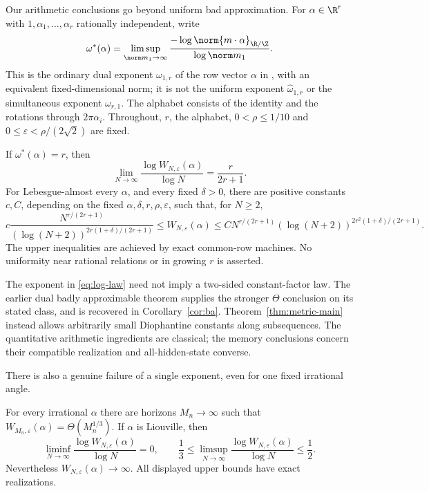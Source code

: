 Our arithmetic conclusions go beyond uniform bad approximation. For $\alpha\in\R^r$ with $1,\alpha_1,\ldots,\alpha_r$ rationally independent, write
\begin{equation}\label{eq:type-intro}
 \omega^*(\alpha)=\limsup_{\norm m_1\to\infty}
       \frac{-\log\norm{m\cdot\alpha}_{\R/\Z}}{\log\norm m_1}.
\end{equation}
This is the ordinary dual exponent $\omega_{1,r}$ of the row vector $\alpha$ in \cite[Definition 1]{BL06}, with an equivalent fixed-dimensional norm; it is not the uniform exponent $\widehat\omega_{1,r}$ or the simultaneous exponent $\omega_{r,1}$. The alphabet consists of the identity and the rotations through $2\pi\alpha_i$. Throughout, $r$, the alphabet, $0<\rho\le1/10$ and
$0\le\varepsilon<\rho/(2\sqrt2)$ are fixed.

\begin{theorem}\label{thm:metric-main}
If $\omega^*(\alpha)=r$, then
\begin{equation}\label{eq:log-law}
 \lim_{N\to\infty}\frac{\log W_{N,\varepsilon}(\alpha)}{\log N}
                         =\frac{r}{2r+1}.
\end{equation}
For Lebesgue-almost every $\alpha$, and every fixed $\delta>0$, there are positive constants $c,C$, depending on the fixed $\alpha,\delta,r,\rho,\varepsilon$, such that, for $N\ge2$,
\begin{equation}\label{eq:ae-log-bounds}
 c\frac{N^{r/(2r+1)}}{(\log(N+2))^{2r(1+\delta)/(2r+1)}}
 \le W_{N,\varepsilon}(\alpha)
 \le C N^{r/(2r+1)}(\log(N+2))^{2r^2(1+\delta)/(2r+1)}.
\end{equation}
The upper inequalities are achieved by exact common-row machines. No uniformity near rational relations or in growing $r$ is asserted.
\end{theorem}

The exponent in \eqref{eq:log-law} need not imply a two-sided constant-factor law. The earlier dual badly approximable theorem supplies the stronger $\Theta$ conclusion on its stated class, and is recovered in Corollary~\ref{cor:ba}. Theorem~\ref{thm:metric-main} instead allows arbitrarily small Diophantine constants along subsequences. The quantitative arithmetic ingredients are classical; the memory conclusions concern their compatible realization and all-hidden-state converse.

There is also a genuine failure of a single exponent, even for one fixed irrational angle.
\begin{theorem}\label{thm:liouville-main}
For every irrational $\alpha$ there are horizons $M_n\to\infty$ such that
$W_{M_n,\varepsilon}(\alpha)=\Theta(M_n^{1/3})$. If $\alpha$ is Liouville, then
\begin{equation}\label{eq:liouville-summary}
 \liminf_{N\to\infty}\frac{\log W_{N,\varepsilon}(\alpha)}{\log N}=0,
 \qquad
 \frac13\le\limsup_{N\to\infty}\frac{\log W_{N,\varepsilon}(\alpha)}{\log N}
 \le\frac12.
\end{equation}
Nevertheless $W_{N,\varepsilon}(\alpha)\to\infty$. All displayed upper bounds have exact realizations.
\end{theorem}

